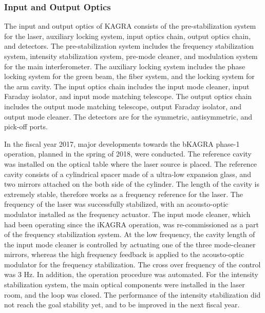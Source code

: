 \subsubsection*{\bf Input and Output Optics}

\vspace{3pt}

\vspace{3pt}

The input and output optics of KAGRA consists of the pre-stabilization system for the laser, auxiliary locking system, input optics chain, output optics chain, and detectors. The pre-stabilization system includes the frequency stabilization system, intensity stabilization system, pre-mode cleaner, and modulation system for the main interferometer. The auxiliary locking system includes the phase locking system for the green beam, the fiber system, and the locking system for the arm cavity. The input optics chain includes the input mode cleaner, input Faraday isolator, and input mode matching telescope. The output optics chain includes the output mode matching telescope, output Faraday isolator, and output mode cleaner. The detectors are for the symmetric, antisymmetric, and pick-off ports.

In the fiscal year 2017, major developments towards the bKAGRA phase-1 operation, planned in the spring of 2018, were conducted. The reference cavity was installed on the optical table where the laser source is placed. The reference cavity consists of a cylindrical spacer made of a ultra-low expansion glass, and two mirrors attached on the both side of the cylinder. The length of the cavity is extremely stable, therefore works as a frequency reference for the laser. The frequency of the laser was successfully stabilized, with an acousto-optic modulator installed as the frequency actuator. The input mode cleaner, which had been operating since the iKAGRA operation, was re-commissioned as a part of the frequency stabilization system. At the low frequency, the cavity length of the input mode cleaner is controlled by actuating one of the three mode-cleaner mirrors, whereas the high frequency feedback is applied to the acousto-optic modulator for the frequency stabilization. The cross over frequency of the control was 3 Hz. In addition, the operation procedure was automated. For the intensity stabilization system, the main optical components were installed in the laser room, and the loop was closed. The performance of the intensity stabilization did not reach the goal stability yet, and to be improved in the next fiscal year.

